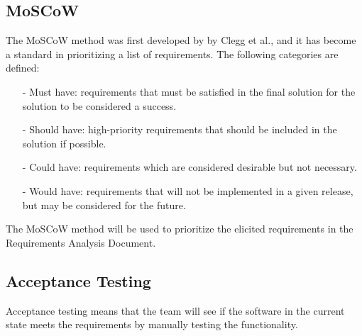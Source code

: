 \subsection{MoSCoW}
The MoSCoW method was first developed by by Clegg et al.\cite{moscow}, and it has become a standard in prioritizing a list of requirements. The following categories are defined:
\begin{itemize}
\item[-] Must have: requirements that must be satisfied in the final solution for the solution to be considered a success.
\item[-] Should have: high-priority requirements that should be included in the solution if possible.
\item[-] Could have: requirements which are considered desirable but not necessary.
\item[-] Would have: requirements that will not be implemented in a given release, but may be considered for the future.
\end{itemize}
The MoSCoW method will be used to prioritize the elicited requirements in the Requirements Analysis Document.
\subsection{Acceptance Testing}
\label{sec:acc_test}
Acceptance testing means that the team will see if the software in the current state meets the requirements by manually testing the functionality.